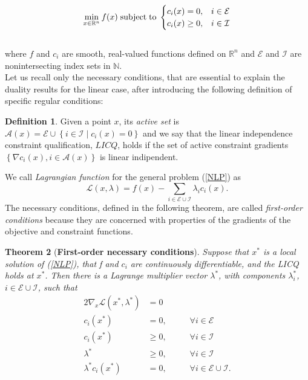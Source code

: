 \documentclass[a4paper,10 pt,titlepage,twoside]{book}
\theoremstyle{plain}
\newtheorem{thm}{Theorem}[chapter]
\theoremstyle{definition}
\newtheorem{defn}[thm]{Definition}
\theoremstyle{remark}
\begin{document}
\begin{equation}\label{NLP}
\min\limits_{x\in\mathbb{R}^{n}} f(x)\text{\;subject\;to\;}\begin{cases} c_{i}(x) = 0, &i \in \mathcal{E}\\ c_{i}(x)\geq 0, &i\in \mathcal{I}\end{cases}
\end{equation}
\\
where $f$ and $c_{i}$ are smooth, real-valued functions defined on $\mathbb{R}^{n}$ and $\mathcal{E}$ and $\mathcal{I}$ are nonintersecting index sets in $\mathbb{N}$.\\Let us recall only the necessary conditions, that are essential to explain the duality results for the linear case, after introducing the following definition of specific regular conditions:
\begin{defn}
	Given a point $x$, its \textit{active set} is $\mathcal{A}(x)= \mathcal{E}\cup\left\lbrace i\in\mathcal{I}\;|\;c_{i}(x) =0\right\rbrace$ and we say that the linear independence constraint qualification, $LICQ$, holds if the set of active constraint gradients $\left\lbrace \nabla c_{i}(x),i\in\mathcal{A}(x)\right\rbrace$ is linear indipendent.
\end{defn}
We call \textit{Lagrangian function} for the general problem (\ref{NLP}) as 
\begin{equation*}
\mathcal{L}\left(x,\lambda\right)=f(x)-\sum_{i\in\mathcal{E}\cup\mathcal{I}}\lambda_{i}c_{i}(x).
\end{equation*}
The necessary conditions, defined in the following theorem, are called \textit{first-order conditions} because they are concerned with properties of the gradients of the objective and constraint functions.

\begin{thm}[\textbf{First-order necessary conditions}]\label{thm:kkt}
Suppose that $x^{*}$ is a local solution of (\ref{NLP}), that f and $c_{i}$ are continuously differentiable, and the LICQ holds at $x^{*}$. Then there is a Lagrange multiplier vector $\lambda^{*}$, with components $\lambda^{*}_{i}$, $i \in \mathcal{E}\cup\mathcal{I}$, such that 
\begin{alignat*}{2}
\nabla_{x}\mathcal{L}(x^{*},\lambda^{*})&=0&&\\
c_{i}(x^{*})&=0, &&\;\;\;\;\forall i\in\mathcal{E}\\
c_{i}(x^{*})&\geq 0, &&\;\;\;\;\forall i\in\mathcal{I}\\
\lambda^{*} &\geq 0, &&\;\;\;\;\forall i\in\mathcal{I}\\
\lambda^{*}c_{i}(x^{*})&= 0,&&\;\;\;\;\forall i\in\mathcal{E}\cup\mathcal{I}.\label{CompCon}\\
\end{alignat*} 
\end{thm}
\end{document}
